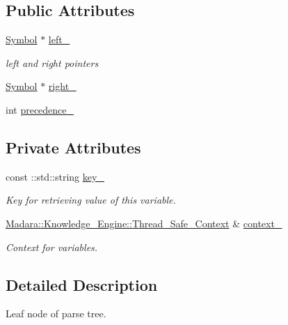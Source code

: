 \subsection*{Public Attributes}
\begin{DoxyCompactItemize}
\item 
\hyperlink{classMadara_1_1Expression__Tree_1_1Symbol}{Symbol} $\ast$ \hyperlink{classMadara_1_1Expression__Tree_1_1Symbol_a7808eb3daad675e2e01409f173a41cee}{left\_\-}
\begin{DoxyCompactList}\small\item\em left and right pointers \item\end{DoxyCompactList}\item 
\hyperlink{classMadara_1_1Expression__Tree_1_1Symbol}{Symbol} $\ast$ \hyperlink{classMadara_1_1Expression__Tree_1_1Symbol_a13467d1c78fbf06c3d64a6a4770eee7a}{right\_\-}
\item 
int \hyperlink{classMadara_1_1Expression__Tree_1_1Symbol_a2de31139261eea47dccd48d377780803}{precedence\_\-}
\end{DoxyCompactItemize}
\subsection*{Private Attributes}
\begin{DoxyCompactItemize}
\item 
const ::std::string \hyperlink{classMadara_1_1Expression__Tree_1_1Variable_aa1a24281fc8deb28411580346595325c}{key\_\-}
\begin{DoxyCompactList}\small\item\em Key for retrieving value of this variable. \item\end{DoxyCompactList}\item 
\hyperlink{classMadara_1_1Knowledge__Engine_1_1Thread__Safe__Context}{Madara::Knowledge\_\-Engine::Thread\_\-Safe\_\-Context} \& \hyperlink{classMadara_1_1Expression__Tree_1_1Variable_aad758024e3cfcc2482280157bf4b7a2e}{context\_\-}
\begin{DoxyCompactList}\small\item\em Context for variables. \item\end{DoxyCompactList}\end{DoxyCompactItemize}


\subsection{Detailed Description}
Leaf node of parse tree. 

